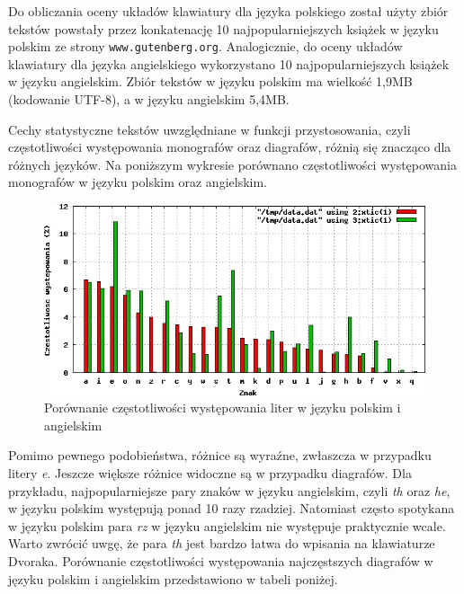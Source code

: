 \documentclass{xmgr}
\begin{document}
Do obliczania oceny układów klawiatury dla języka polskiego został użyty zbiór tekstów powstały przez konkatenację 10 najpopularniejszych książek w języku polskim ze strony {\tt www.gutenberg.org}. Analogicznie, do oceny układów klawiatury dla języka angielskiego wykorzystano 10 najpopularniejszych książek w języku angielskim. Zbiór tekstów w języku polskim ma wielkość 1,9MB (kodowanie UTF-8), a w języku angielskim 5,4MB.

Cechy statystyczne tekstów uwzględniane w funkcji przystosowania, czyli częstotliwości występowania monografów oraz diagrafów, różnią się znacząco dla różnych języków. Na poniższym wykresie porównano częstotliwości występowania monografów w języku polskim oraz angielskim.

\begin{figure}[!tbh]
\centering
\includegraphics[width=.8\hsize]{fig/frequencies}
\caption{Porównanie częstotliwości występowania liter w języku polskim i angielskim}
\end{figure}

Pomimo pewnego podobieństwa, różnice są wyraźne, zwłaszcza w przypadku litery \emph{e}. Jeszcze większe różnice widoczne są w przypadku diagrafów. Dla przykładu, najpopularniejsze pary znaków w języku angielskim, czyli \emph{th} oraz \emph{he}, w języku polskim występują ponad 10 razy rzadziej. Natomiast często spotykana w języku polskim para \emph{rz} w języku angielskim nie występuje praktycznie wcale. Warto zwrócić uwgę, że para \emph{th} jest bardzo łatwa do wpisania na klawiaturze Dvoraka. Porównanie częstotliwości występowania najczęstszych diagrafów w języku polskim i angielskim przedstawiono w tabeli poniżej.\newline
\end{document}

